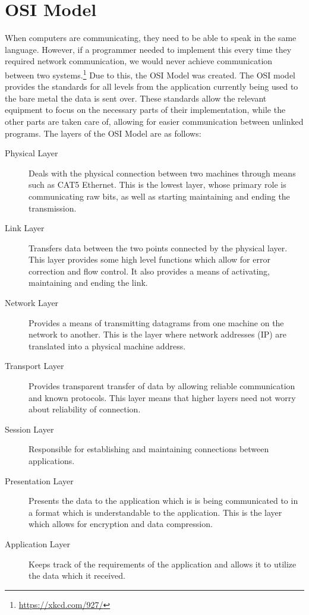 \documentclass[a4paper,11pt]{report}
\begin{document}
	\section{OSI Model}
		When computers are communicating, they need to be able to speak in the same language.\cite{HackingAOE} 
		However, if a programmer needed to implement this every time they required network communication, we would never achieve communication between two systems.\footnote{\url{https://xkcd.com/927/}} 
		Due to this, the OSI Model was created. 
		The OSI model provides the standards for all levels from the application currently being used to the bare metal the data is sent over. 
		These standards allow the relevant equipment to focus on the necessary parts of their implementation, while the other parts are taken care of, allowing for easier communication between unlinked programs. 
		The layers of the OSI Model are as follows:
		\begin{description}
			\item[Physical Layer]
				Deals with the physical connection between two machines through means such as CAT5 Ethernet. 
				This is the lowest layer, whose primary role is communicating raw bits, as well as starting maintaining and ending the transmission. 
			\item[Link Layer]
				Transfers data between the two points connected by the physical layer. 
				This layer provides some high level functions which allow for error correction and flow control. 
				It also provides a means of activating, maintaining and ending the link. 
			\item[Network Layer]
				Provides a means of transmitting datagrams from one machine on the network to another. 
				This is the layer where network addresses (IP) are translated into a physical machine address. 
			\item[Transport Layer]
				Provides transparent transfer of data by allowing reliable communication and known protocols. 
				This layer means that higher layers need not worry about reliability of connection. 
			\item[Session Layer]
				Responsible for establishing and maintaining connections between applications. 
			\item[Presentation Layer]
				Presents the data to the application which is is being communicated to in a format which is understandable to the application. 
				This is the layer which allows for encryption and data compression. 
			\item[Application Layer] 
				Keeps track of the requirements of the application and allows it to utilize the data which it received. 
		\end{description}
\end{document}
